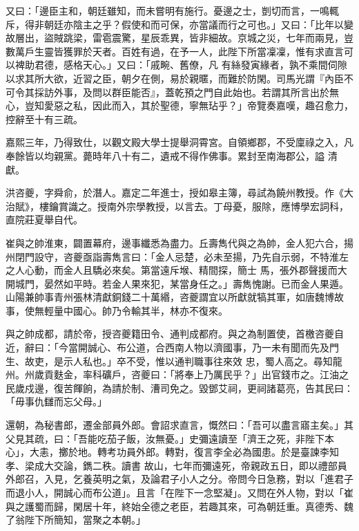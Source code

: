 \begin{pinyinscope}
 又曰：「邊臣主和，朝廷雖知，而未嘗明有施行。憂邊之士，剴切而言，一鳴輒斥，得非朝廷亦陰主之乎？假使和而可保，亦當議而行之可也。」又曰：「比年以變故層出，盜賊跳梁，雷雹震驚，星辰乖異，皆非細故。京城之災，七年而兩見，豈數萬戶生靈皆獲罪於天者。百姓有過，在予一人，此陛下所當凜凜，惟有求直言可以裨助君德，感格天心。」又曰：「戚畹、舊僚，凡
 有絲發寅緣者，孰不乘間伺隙以求其所大欲，近習之臣，朝夕在側，易於親暱，而難於防閑。司馬光謂『內臣不可令其採訪外事，及問以群臣能否』，蓋乾預之門自此始也。若謂其所言出於無心，豈知愛惡之私，因此而入，其於聖德，寧無玷乎？」帝覽奏嘉嘆，趣召愈力，控辭至十有三疏。



 嘉熙三年，乃得致仕，以觀文殿大學士提舉洞霄宮。自領鄉郡，不受廩祿之入，凡奉餘皆以均親黨。薨時年八十有二，遺戒不得作佛事。累封至南海郡公，謚
 清獻。



 洪咨夔，字舜俞，於潛人。嘉定二年進士，授如皋主簿，尋試為饒州教授。作《大治賦》，樓鑰賞識之。授南外宗學教授，以言去。丁母憂，服除，應博學宏詞科，直院莊夏舉自代。



 崔與之帥淮東，闢置幕府，邊事纖悉為盡力。丘壽雋代與之為帥，金人犯六合，揚州閉門設守，咨夔亟詣壽雋言曰：「金人忌楚，必未至揚，乃先自示弱，不特淮左之人心動，而金人且驕必來矣。第當遠斥堠、精間探，簡士
 馬，張外郡聲援而大開城門，晏然如平時。若金人果來犯，某當身任之。」壽雋愧謝。已而金人果遁。山陽兼帥事青州張林清獻銅錢二十萬緡，咨夔謂宜以所獻就犒其軍，如唐魏博故事，使無輕量中國心。帥乃令輸其半，林亦不復來。



 與之帥成都，請於帝，授咨夔籍田令、通判成都府。與之為制置使，首檄咨夔自近，辭曰：「今當開誠心、布公道，合西南人物以濟國事，乃一未有聞而先及門生、故吏，是示人私也。」卒不受，惟以通判職事往來效
 忠，蜀人高之。尋知龍州。州歲貢麩金，率科礦戶，咨夔曰：「將奉上乃厲民乎？」出官錢市之。江油之民歲戍邊，復苦餫餉，為請於制、漕司免之。毀鄧艾祠，更祠諸葛亮，告其民曰：「毋事仇讎而忘父母。」



 還朝，為秘書郎，遷金部員外郎。會詔求直言，慨然曰：「吾可以盡言寤主矣。」其父見其疏，曰：「吾能吃茄子飯，汝無憂。」史彌遠讀至「濟王之死，非陛下本心」，大恚，擲於地。轉考功員外郎。轉對，復言李全必為國患。於是臺諫李知孝、梁成大交論，鐫二秩。讀書
 故山，七年而彌遠死，帝親政五日，即以禮部員外郎召，入見，乞養英明之氣，及論君子小人之分。帝問今日急務，對以「進君子而退小人，開誠心而布公道」。且言「在陛下一念堅凝」。又問在外人物，對以「崔與之護蜀而歸，閑居十年，終始全德之老臣，若趣其來，可為朝廷重。真德秀、魏了翁陛下所簡知，當聚之本朝。」




\end{pinyinscope}
